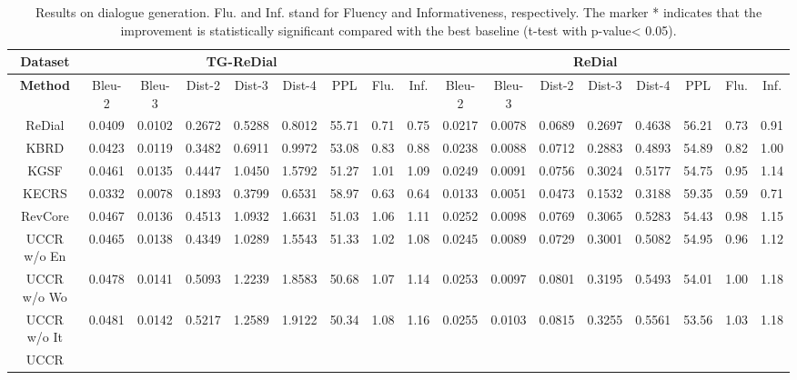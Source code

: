 \documentclass[sigconf,natbib=true]{acmart}
\begin{document}
\begin{table*}[!th]
	\small
	\centering
\setlength{\tabcolsep}{2pt}
	\caption{Results on dialogue generation. Flu. and Inf. stand for Fluency and Informativeness, respectively. The marker * indicates that the improvement is statistically significant compared with the best baseline (t-test with p-value< 0.05).} \label{dial_results}
	\begin{tabular}{@{}c|cccccccc|cccccccc@{}}
		\toprule
		Dataset & \multicolumn{7}{c}{TG-ReDial} & & \multicolumn{7}{c}{ReDial}\\
		\midrule
		\textbf{Method} & Bleu-2 & Bleu-3 & Dist-2 & Dist-3 & Dist-4 & PPL & Flu. & Inf. & Bleu-2 & Bleu-3 & Dist-2 & Dist-3 & Dist-4 & PPL & Flu. & Inf.\\
		\midrule

		ReDial & 0.0409 & 0.0102 & 0.2672 & 0.5288 & 0.8012 & 55.71 & 0.71 & 0.75 & 0.0217 & 0.0078 & 0.0689 & 0.2697 & 0.4638 & 56.21 & 0.73 & 0.91 \\
		KBRD & 0.0423 & 0.0119 & 0.3482 & 0.6911 & 0.9972 & 53.08 & 0.83 & 0.88 & 0.0238 & 0.0088 & 0.0712 & 0.2883 & 0.4893 & 54.89 & 0.82 & 1.00  \\
		KGSF & 0.0461 & 0.0135 & 0.4447 & 1.0450 & 1.5792 & 51.27 & 1.01 & 1.09 & 0.0249 & 0.0091 & 0.0756 & 0.3024 & 0.5177 & 54.75 & 0.95 & 1.14 \\
		KECRS & 0.0332 & 0.0078 & 0.1893 & 0.3799 & 0.6531 & 58.97 & 0.63 & 0.64 & 0.0133 & 0.0051 & 0.0473 & 0.1532 & 0.3188 & 59.35 & 0.59 & 0.71 \\
		RevCore & 0.0467 & 0.0136 & 0.4513 & 1.0932 & 1.6631 & 51.03 & 1.06 & 1.11 & 0.0252 & 0.0098 & 0.0769 & 0.3065 & 0.5283 & 54.43 & 0.98 & 1.15 \\
		\midrule
		UCCR w/o En & 0.0465 & 0.0138 & 0.4349 & 1.0289 & 1.5543 & 51.33 & 1.02 & 1.08 & 0.0245 & 0.0089 & 0.0729 & 0.3001 & 0.5082 & 54.95 & 0.96 & 1.12 \\
		UCCR w/o Wo & 0.0478 & 0.0141 & 0.5093 & 1.2239 & 1.8583 & 50.68 & 1.07 & 1.14 & 0.0253 & 0.0097 & 0.0801 & 0.3195 & 0.5493 & 54.01 & 1.00 & 1.18 \\
		UCCR w/o It & 0.0481 & 0.0142 & 0.5217 & 1.2589 & 1.9122 & 50.34 & 1.08 & 1.16 & 0.0255 & 0.0103 & 0.0815 & 0.3255 & 0.5561 & 53.56 & 1.03 & 1.18 \\
		UCCR &  &  &  &  &  &  &  &  &  &  &  &  &  &  &  &  \\
		\bottomrule
	\end{tabular}
\end{table*}
\end{document}
